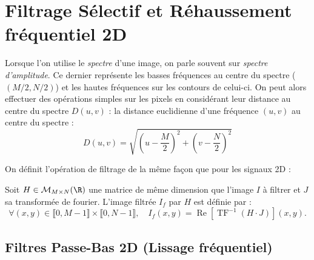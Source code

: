 
\section{Filtrage Sélectif et Réhaussement fréquentiel 2D}

Lorsque l'on utilise le \emph{spectre} d'une image, on parle souvent sur \emph{spectre d'amplitude}. Ce dernier représente les basses fréquences au centre du spectre ($(M/2, N/2)$) et les hautes fréquences sur les contours de celui-ci. On peut alors effectuer des opérations simples sur les pixels en considérant leur distance au centre du spectre $D(u,v)$ : la distance euclidienne d'une fréquence $(u,v)$ au centre du spectre :
\begin{equation}
    D(u,v) = \sqrt{\left(u - \frac{M}{2}\right)^2 + \left(v - \frac{N}{2}\right)^2}
\end{equation}

On définit l'opération de filtrage de la même façon que pour les signaux 2D : 
\begin{definition}[Filtrage]
    Soit $H \in \mathcal{M}_{M \times N}(\R)$ une matrice de même dimension que l'image $I$ à filtrer et $J$ sa transformée de fourier. L'image filtrée $I_f$ par $H$ est définie par : 
    \begin{equation}
        \forall (x,y) \in \llbracket 0, M-1 \rrbracket \times \llbracket 0, N-1 \rrbracket, \quad I_f(x,y) = \operatorname{Re}\left[\operatorname{TF}^{-1}(H \cdot J)\right](x,y). 
    \end{equation}
\end{definition}

\subsection{Filtres Passe-Bas 2D (Lissage fréquentiel)}

